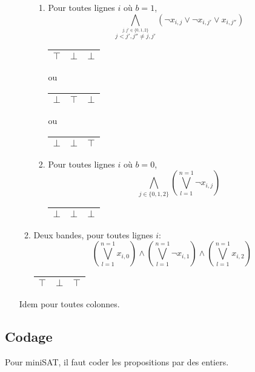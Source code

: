 \documentclass[a4paper,12pt]{report}
\begin{document}
\begin{enumerate}
\begin{enumerate}
\begin{enumerate}
			\item Pour toutes lignes $i$ où $b=1$, 
			$$\bigwedge_{\stackrel{j,j' \in\{0,1,2\}}{j<j', j''\neq j,j'}} (\lnot x_{i,j}\vee \lnot x_{i,j'} \vee x_{i,j''} ) $$
			\begin{center}						
			\begin{tabular}{|c|c|c|}
			\hline 
			$\top$ & $\bot$  & $\bot$  \\ 
			\hline  
			\end{tabular}
			ou
			\begin{tabular}{|c|c|c|}
			\hline 
			$\bot$ & $\top$  & $\bot$  \\ 
			\hline  
			\end{tabular}
			ou
			\begin{tabular}{|c|c|c|}
			\hline 
			$\bot$ & $\bot$  & $\top$  \\ 
			\hline  
			\end{tabular}
			\end{center}
			
			\item Pour toutes lignes $i$ où $b=0$,
			$$\bigwedge_{j\in\{0,1,2\}}\left( \bigvee_{l=1}^{n=1} \lnot x_{i,j} \right)$$
			\begin{center}						
			\begin{tabular}{|c|c|c|}
			\hline 
			$\bot$ & $\bot$  & $\bot$  \\ 
			\hline  
			\end{tabular}
			\end{center}
			
		\end{enumerate}

		\item Deux bandes, pour toutes lignes $i$:
		$$\left( \bigvee_{l=1}^{n=1} x_{i,0} \right) \wedge \left(\bigvee_{l=1}^{n=1} \lnot x_{i,1}\right) \wedge \left(\bigvee_{l=1}^{n=1} x_{i,2}\right)$$
			\begin{center}						
			\begin{tabular}{|c|c|c|}
			\hline 
			$\top$ & $\bot$  & $\top$  \\ 
			\hline  
			\end{tabular}
			\end{center}
			
	\end{enumerate}
	Idem pour toutes colonnes. 
\end{enumerate}

\subsection{Codage}
Pour miniSAT, il faut coder les propositions par des entiers.
\end{document}
